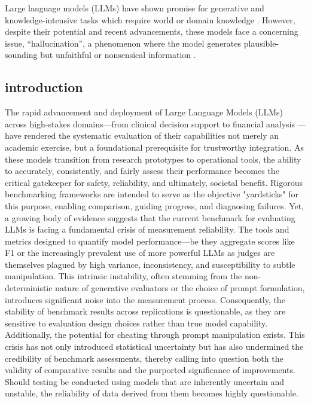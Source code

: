 Large language models (LLMs) have shown promise for generative and knowledge-intensive tasks which require world or domain knowledge \cite{petroni2021kilt_LR}.  However, despite their potential and recent advancements, these models face a concerning issue, “hallucination”, a phenomenon where the model generates plausible-sounding but unfaithful or nonsensical information \cite{ji2023survey}.

\subsection{introduction}
The rapid advancement and deployment of Large Language Models (LLMs) across high-stakes domains—from clinical decision support to financial analysis \cite{salehin2025systematic}\cite{li2023large}\cite{shool2025systematic}—have rendered the systematic evaluation of their capabilities not merely an academic exercise, but a foundational prerequisite for trustworthy integration\cite{yu2025survey}. As these models transition from research prototypes to operational tools\cite{shen2024llm}, the ability to accurately\cite{zhou2024llm}, consistently\cite{lee2025evaluating}, and fairly assess their performance becomes the critical gatekeeper for safety, reliability, and ultimately, societal benefit\cite{zhou2023don}. Rigorous benchmarking frameworks are intended to serve as the objective "yardsticks" for this purpose, enabling comparison, guiding progress, and diagnosing failures\cite{mohammadi2025evaluation}.
Yet, a growing body of evidence suggests that the current benchmark for evaluating LLMs is facing a fundamental crisis of measurement reliability\cite{vendrow2025large}. The tools and metrics designed to quantify model performance—be they aggregate scores like F1 or the increasingly prevalent use of more powerful LLMs as judges are themselves plagued by high variance, inconsistency, and susceptibility to subtle manipulation\cite{yuan2025llm}\cite{vendrow2024large}. This intrinsic instability, often stemming from the non-deterministic nature of generative evaluators or the choice of prompt formulation, introduces significant noise into the measurement process\cite{havrilla2024understanding}. Consequently, the stability of benchmark results across replications is questionable, as they are sensitive to evaluation design choices rather than true model capability\cite{atil2024llm}. Additionally, the potential for cheating through prompt manipulation exists\cite{banerjee2024vulnerability}. This crisis has not only introduced statistical uncertainty but has also undermined the credibility of benchmark assessments, thereby calling into question both the validity of comparative results and the purported significance of improvements\cite{perlitz2024these}. Should testing be conducted using models that are inherently uncertain and unstable, the reliability of data derived from them becomes highly questionable\cite{ye2024benchmarking}\cite{yadkori2024believe}.
